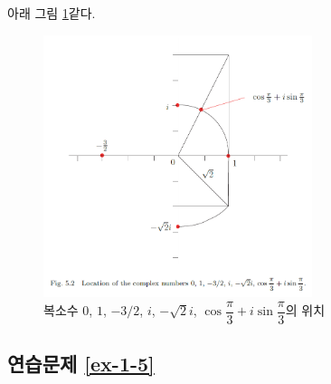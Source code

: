 아래 그림 \ref{fig-5-2}\와 같다.

\begin{figure}[h!]
\begin{center}
\includegraphics[width=0.7\textwidth]{./Solution/figs/fig-5-2}
\end{center}
\caption{복소수 $0$, $1$, $-3/2$, $i$, $-\sqrt{2}i$,
$\cos\dfrac\pi3 + i\sin\dfrac\pi3$의 위치}
\label{fig-5-2}
\end{figure}

\subsection*{연습문제 \ref{ex-1-5}}

